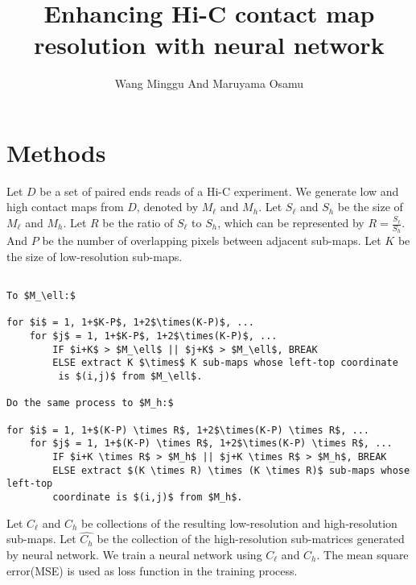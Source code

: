 \documentclass{article}
\begin{document}
\title{Enhancing Hi-C contact map resolution with neural network}
\author{Wang Minggu And Maruyama Osamu}
\maketitle



\section{Methods}


Let $D$ be a set of paired ends reads of a Hi-C experiment. 
We generate low and high contact maps from $D$, denoted by $M_\ell$ and $M_h$. 
Let $S_\ell$ and $S_h$ be the size of $M_\ell$ and $M_h$. 
Let $R$ be the ratio of $S_\ell$ to $S_h$, which can be represented by
$R = \frac{S_\ell}{S_h}$. And $P$ be the number of overlapping pixels between adjacent sub-maps.
Let $K$ be the size of low-resolution sub-maps.

\begin{Verbatim}[commandchars=\\\{\},codes={\catcode`$=3\catcode`_=8\catcode`^=7}]
% Divide matrices $M_\ell$ and $M_h$ \

To $M_\ell:$

for $i$ = 1, 1+$K-P$, 1+2$\times(K-P)$, ...
    for $j$ = 1, 1+$K-P$, 1+2$\times(K-P)$, ...
        IF $i+K$ > $M_\ell$ || $j+K$ > $M_\ell$, BREAK 
        ELSE extract K $\times$ K sub-maps whose left-top coordinate
         is $(i,j)$ from $M_\ell$.

Do the same process to $M_h:$

for $i$ = 1, 1+$(K-P) \times R$, 1+2$\times(K-P) \times R$, ...
    for $j$ = 1, 1+$(K-P) \times R$, 1+2$\times(K-P) \times R$, ...
        IF $i+K \times R$ > $M_h$ || $j+K \times R$ > $M_h$, BREAK 
        ELSE extract $(K \times R) \times (K \times R)$ sub-maps whose left-top 
        coordinate is $(i,j)$ from $M_h$.
\end{Verbatim}



\noindent Let $C_\ell$ and $C_h$ be collections of the resulting low-resolution and high-resolution
sub-maps. Let $\hat{C_h}$ be the collection of the high-resolution sub-matrices generated by neural network. We train a neural network using $C_\ell$ and $C_h$. The mean square error(MSE) is used as 
loss function in the training process. 
\end{document}
